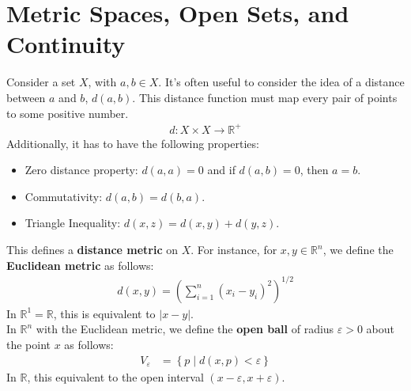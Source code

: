 \documentclass[12pt]{extarticle}
\newcommand{\R}{\mathbb{R}}
\begin{document}
  \section*{Metric Spaces, Open Sets, and Continuity}%
  Consider a set $X$, with $a,b\in X$. It's often useful to consider the idea of a distance between $a$ and $b$, $d(a,b)$. This distance function must map every pair of points to some positive number.
  \begin{align*}
    d: X\times X \rightarrow \R^+
  \end{align*}
  Additionally, it has to have the following properties:
  \begin{itemize}
    \item Zero distance property: $d(a,a) = 0$ and if $d(a,b) = 0$, then $a = b$.
    \item Commutativity: $d(a,b) = d(b,a)$.
    \item Triangle Inequality: $d(x,z) = d(x,y) + d(y,z)$.
  \end{itemize}
  This defines a \textbf{distance metric} on $X$. For instance, for $x,y\in\R^n$, we define the \textbf{Euclidean metric} as follows:
  \begin{align*}
    d(x,y) = \left(\sum_{i=1}^{n}(x_i-y_i)^2\right)^{1/2}
  \end{align*}
  In $\R^1 = \R$, this is equivalent to $|x-y|$.\\

  In $\R^n$ with the Euclidean metric, we define the \textbf{open ball} of radius $\varepsilon > 0$ about the point $x$ as follows:
  \begin{align*}
    V_{\varepsilon} &= \left\{p \mid d(x,p) < \varepsilon\right\}
  \end{align*}
  In $\R$, this equivalent to the open interval $(x-\varepsilon,x+\varepsilon)$.\\
\end{document}
